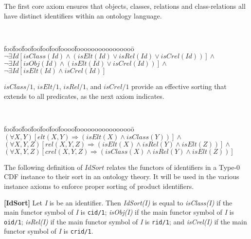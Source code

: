 The first core axiom ensures that objects, classes, relations and
class-relations all have distinct identifiers within an ontology
language.
\begin{axiom} \label{ax:distinct}
\ \\
\begin{tabbing}
foo\=foo\=foo\=foo\=foo\=foo\=foooo\=foooooooooooooooo\=\kill
\> $\neg \exists Id [isClass(Id) \wedge (isElt(Id) \vee isRel(Id) 
	                                 \vee isCrel(Id))] \wedge $ \\
\> $\neg \exists Id [isObj(Id) \wedge (isElt(Id) \vee isCrel(Id))] \wedge $ \\
\> $\neg \exists Id [isElt(Id) \wedge isCrel(Id)] $ 
\end{tabbing}
\end{axiom} 

$isClass/1$, $isElt/1$, $isRel/1$, and $isCrel/1$ provide an effective
sorting that extends to all predicates, as the next axiom indicates.

\begin{axiom} \rm \label{ax:sorts}
\ \\
\begin{tabbing}
foo\=foo\=foo\=foo\=foo\=foo\=foooo\=foooooooooooooooo\=\kill
\> \> $(\forall X,Y) [elt(X,Y) \Rightarrow (isElt(X) \wedge isClass(Y))]
								\wedge $ \\
\> \> $(\forall X,Y,Z) [rel(X,Y,Z) \Rightarrow (isElt(X) \wedge isRel(Y)
					   \wedge isElt(Z))] \wedge  $ \\
\> \> $(\forall X,Y,Z) [crel(X,Y,Z) \Rightarrow (isClass(X) \wedge isRel(Y)
					   \wedge isElt(Z))] $ \\
\end{tabbing}
\end{axiom} 


The following definition of $IdSort$ relates the functors of
identifiers in a Type-0 CDF instance to their sort in an ontology
theory.  It will be used in the various instance axioms to enforce
proper sorting of product identifiers.

\begin{definition}{\bf [IdSort]} \label{def:IdSort}
Let {\em I} is be an identifier. Then {\em IdSort(I)} is equal to {\em
isClass(I)} if the main functor symbol of {\em I} is {\tt cid/1}; {\em
isObj(I)} if the main functor symbol of {\em I} is {\tt oid/1}; {\em
isRel(I)} if the main functor symbol of {\em I} is {\tt rid/1}; and
{\em isCrel(I)} if the main functor symbol of {\em I} is {\tt crid/1}.
\end{definition}

